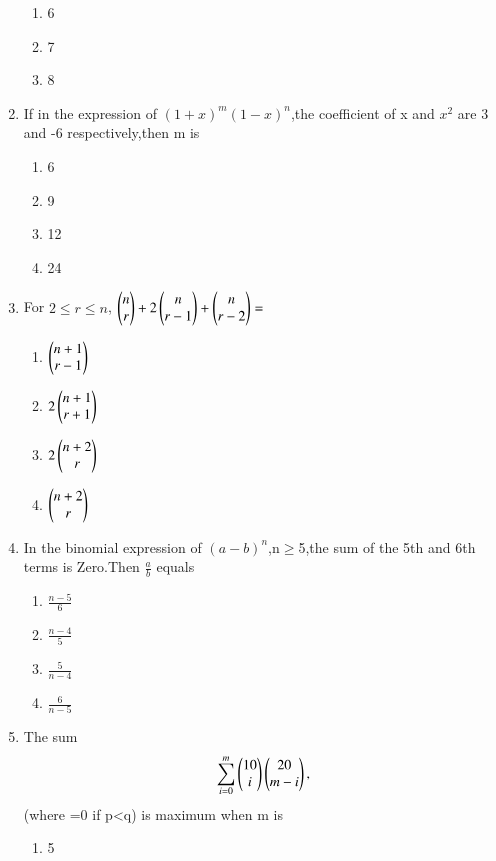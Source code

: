 \begin{enumerate}[label=\arabic*.,ref=\thesubsection.\theenumi]
\begin{enumerate}
\item 6

\item 7

\item 8
\end{enumerate}
\item If in the expression of $(1+x)^m (1-x)^n$,the coefficient of x and $x^2$ are 3 and -6 respectively,then m is
\begin{enumerate}
\item 6

\item 9

\item 12

\item 24
\end{enumerate}
\item For $2 \leq r \leq n$,
$\begin{pmatrix}n\\r\end{pmatrix}+2\begin{pmatrix}n\\r-1\end{pmatrix}+\begin{pmatrix}n\\r-2\end{pmatrix}=$
\begin{enumerate}
 \item $\begin{pmatrix}n+1\\r-1\end{pmatrix}$

 \item $2\begin{pmatrix}n+1\\r+1\end{pmatrix}$

 \item $2\begin{pmatrix}n+2\\r\end{pmatrix}$

 \item $\begin{pmatrix}n+2\\r\end{pmatrix}$ 
 \end{enumerate}
\item In the binomial expression of $(a-b)^n$,n$\geq$5,the sum of the 5th and 6th terms is Zero.Then $\frac{a}{b}$ equals
\begin{enumerate}
\item $\frac{n-5}{6}$

\item $\frac{n-4}{5}$

\item $\frac{5}{n-4}$

\item $\frac{6}{n-5}$
\end{enumerate}
\item The sum $$\sum_{i=0}^{m} \begin{pmatrix}10\\i\end{pmatrix} \begin{pmatrix}20\\m-i\end{pmatrix}, $$ (where =0 if p<q) is maximum when m is
\begin{enumerate}
\item 5


\end{enumerate}
\end{enumerate}
